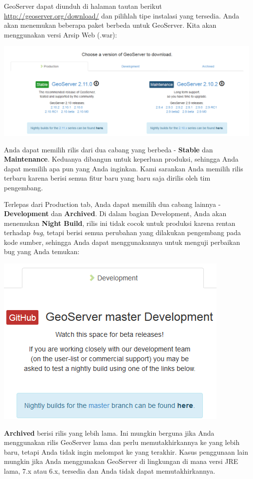 \documentclass[]{book}
\begin{document}
GeoServer dapat diunduh di halaman tautan berikut \url{http://geoserver.org/download/} dan pilihlah tipe instalasi yang tersedia. Anda akan menemukan beberapa paket berbeda untuk GeoServer. Kita akan menggunakan versi Arsip Web (.war):

\begin{center}\includegraphics[width=0.6\linewidth]{images/07/fig72} \end{center}

Anda dapat memilih rilis dari dua cabang yang berbeda - \textbf{Stable} dan \textbf{Maintenance}. Keduanya dibangun untuk keperluan produksi, sehingga Anda dapat memilih apa pun yang Anda inginkan. Kami sarankan Anda memilih rilis terbaru karena berisi semua fitur baru yang baru saja dirilis oleh tim pengembang.

Terlepas dari Production tab, Anda dapat memilih dua cabang lainnya - \textbf{Development} dan \textbf{Archived}. Di dalam bagian Development, Anda akan menemukan \textbf{Night Build}, rilis ini tidak cocok untuk produksi karena rentan terhadap \emph{bug}, tetapi berisi semua perubahan yang dilakukan pengembang pada kode sumber, sehingga Anda dapat menggunakannya untuk menguji perbaikan bug yang Anda temukan:

\begin{center}\includegraphics[width=0.6\linewidth]{images/07/fig73} \end{center}

\textbf{Archived} berisi rilis yang lebih lama. Ini mungkin berguna jika Anda menggunakan rilis GeoServer lama dan perlu memutakhirkannya ke yang lebih baru, tetapi Anda tidak ingin melompat ke yang terakhir. Kasus penggunaan lain mungkin jika Anda menggunakan GeoServer di lingkungan di mana versi JRE lama, 7.x atau 6.x, tersedia dan Anda tidak dapat memutakhirkannya.
\end{document}
